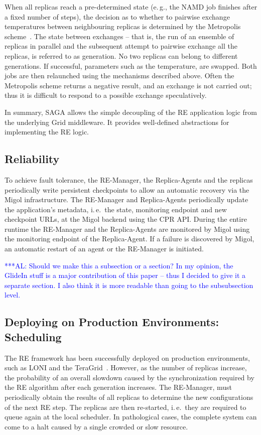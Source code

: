 \documentclass{rspublic}
\newcommand{\alnote}[1]{ {\textcolor{blue} { ***AL: #1 }}}
\newcommand{\alnote}[1]{}
\newcommand{\remanager}[1]{RE-Manager }
\begin{document}
When all replicas reach a pre-determined state (e.\,g., the NAMD job
finishes after a fixed number of steps), the decision as to whether to
pairwise exchange temperatures between neighbouring replicas is
determined by the Metropolis scheme~\citep{metropolis:1087}.  The
state between exchanges -- that is, the run of an ensemble of replicas
in parallel and the subsequent attempt to pairwise exchange all the
replicas, is referred to as generation. No two replicas can belong to
different generations.  If successful, parameters such as the
temperature, are swapped. Both jobs are then relaunched using the
mechanisms described above. Often the Metropolis scheme returns a
negative result, and an exchange is not carried out; thus it is
difficult to respond to a possible exchange speculatively.

In summary, SAGA allows the simple decoupling of the RE application
logic from the underlying Grid middleware. It provides well-defined
abstractions for implementing the RE logic.%


\subsection{Reliability}
To achieve fault tolerance, the RE-Manager, the Replica-Agents and the
replicas periodically write persistent checkpoints to allow
an automatic recovery via the Migol infrastructure. The \remanager\
and Replica-Agents periodically update the application's metadata,
i.\,e.\ the state, monitoring endpoint and new checkpoint URLs, at the
Migol backend using the CPR API. During the entire runtime the
\remanager\ and the Replica-Agents are monitored by Migol using the
monitoring endpoint of the Replica-Agent. If a failure is discovered
by Migol, an automatic restart of an agent or the RE-Manager is
initiated.

\alnote{Should we make this a subsection or a section? In my opinion,
the GlideIn stuff is a major contribution of this paper -- thus I decided to
give it a separate section. I also think it is more readable than going to the
subsubsection level.}           

\subsection{Deploying on Production Environments: Scheduling}

The RE framework has been successfully deployed on production
environments, such as LONI and the
TeraGrid~\citep{Luckow:2008la}. However, as the number of replicas
increase, the probability of an overall slowdown caused by the
synchronization required by the RE algorithm after each generation
increases.  The RE-Manager, must periodically obtain the results of
all replicas to determine the new configurations of the next RE
step. The replicas are then re-started, i.\,e.\ they are required to
queue again at the local scheduler. In pathological cases, the
complete system can come to a halt caused by a single crowded or slow
resource. 
\end{document}
